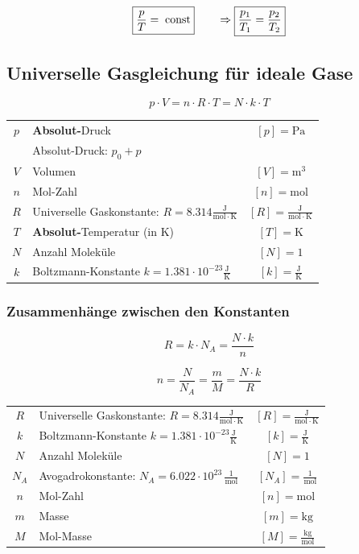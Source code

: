$$ \boxed{ \frac{p}{T} = \; \mathrm{const} } \qquad  \Rightarrow \boxed{ \frac{p_1}{T_1} = \frac{p_2}{T_2} }$$


	
\subsection{Universelle Gasgleichung für ideale Gase}

$$ \boxed{ p \cdot V = n \cdot R \cdot T = N \cdot k \cdot T }$$
	
	
\begin{tabular}{c l c}
	$p$ & \textbf{Absolut-}Druck & $[p] = \mathrm{Pa}$ \\
	    & Absolut-Druck: $p_0 + p$ & \\
	$V$ & Volumen & $[V] = \mathrm{m^3}$ \\
	$n$ & Mol-Zahl & $[n] = \mathrm{mol}$ \\
	\rule{0pt}{8pt}$R$ & Universelle Gaskonstante: $R = 8.314 \mathrm{\frac{J}{mol \cdot K}}$ & $[R] = \mathrm{\frac{J}{mol \cdot K}} $ \\
	$T$ & \textbf{Absolut-}Temperatur (in K) & $[T] = \mathrm{K}$ \\
	$N$ & Anzahl Moleküle & $[N] = 1$ \\
	\rule{0pt}{8pt}$k$ & Boltzmann-Konstante $k = 1.381 \cdot 10^{-23} \mathrm{\frac{J}{K}}$ & $[k] = \mathrm{\frac{J}{K}}$ \\
\end{tabular}
	
	
	
	
\subsubsection{Zusammenhänge zwischen den Konstanten}
	
$$  \boxed{ R = k \cdot N_A = \frac{N \cdot k}{n} } $$

$$\boxed{ n = \frac{N}{N_A} = \frac{m}{M} = \frac{N \cdot k}{R} } $$
	


\begin{tabular}{c l c}
	\rule{0pt}{8pt}$R$ & Universelle Gaskonstante: $R = 8.314 \mathrm{\frac{J}{mol \cdot K}}$ & $[R] = \mathrm{\frac{J}{mol \cdot K}} $ \\
	\rule{0pt}{8pt}$k$ & Boltzmann-Konstante $k = 1.381 \cdot 10^{-23} \mathrm{\frac{J}{K}}$ & $[k] = \mathrm{\frac{J}{K}}$ \\
	$N$ & Anzahl Moleküle & $[N] = 1$ \\
	\rule{0pt}{8pt}$N_A$ & 	Avogadrokonstante: $N_A = 6.022 \cdot 10^{23} \, \mathrm{\frac{1}{mol}} $ & $[N_A] =  \mathrm{\frac{1}{mol}}$  \\	
	$n$ & Mol-Zahl & $[n] = \mathrm{mol}$ \\
	$m$ & Masse & $[m] = \mathrm{kg}$ \\
	\rule{0pt}{8pt}$M$ & Mol-Masse & $[M] = \mathrm{\frac{kg}{mol}}$ \\
\end{tabular}

